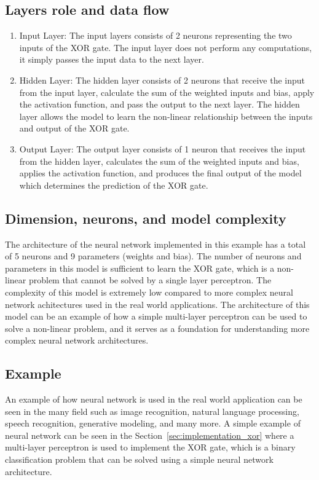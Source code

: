 \documentclass[a4paper,10pt]{article}
\begin{document}
\subsection{Layers role and data flow}
\begin{enumerate}
    \item Input Layer: The input layers consists of 2 neurons representing the two inputs of the XOR gate.
    The input layer does not perform any computations, it simply passes the input data to the next layer.
    \item Hidden Layer: The hidden layer consists of 2 neurons that receive the input from the input layer, calculate the sum of the weighted inputs and bias, apply the activation function, and pass the output to the next layer.
    The hidden layer allows the model to learn the non-linear relationship between the inputs and output of the XOR gate.
    \item Output Layer: The output layer consists of 1 neuron that receives the input from the hidden layer, calculates the sum of the weighted inputs and bias, applies the activation function, and produces the final output of the model which determines the prediction of the XOR gate.
\end{enumerate}

\subsection{Dimension, neurons, and model complexity}
The architecture of the neural network implemented in this example has a total of 5 neurons and 9 parameters (weights and bias).
The number of neurons and parameters in this model is sufficient to learn the XOR gate, which is a non-linear problem that cannot be solved by a single layer perceptron.
The complexity of this model is extremely low compared to more complex neural network achitectures used in the real world applications.
The architecture of this model can be an example of how a simple multi-layer perceptron can be used to solve a non-linear problem, and it serves as a foundation for understanding more complex neural network architectures.

\subsection{Example}
An example of how neural network is used in the real world application can be seen in the many field such as image recognition, natural language processing, speech recognition, generative modeling, and many more.
A simple example of neural network can be seen in the Section~\ref{sec:implementation_xor} where a multi-layer perceptron is used to implement the XOR gate, which is a binary classification problem that can be solved using a simple neural network architecture.
\end{document}
